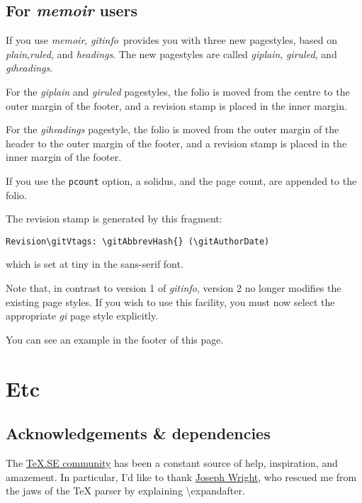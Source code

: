 \documentclass[a4paper,12pt,twoside,openany]{memoir}
\newcommand{\sfit}[1]{\textit{#1}}
\newcommand{\tpname}{\sfit{gitinfo}}
\begin{document}
\section{For \sfit{memoir} users}
If you use \sfit{memoir}, \tpname\ provides you with
three new pagestyles, based on
\sfit{plain},\sfit{ruled}, and \sfit{headings}.
The new pagestyles are called
\sfit{giplain}, \sfit{giruled}, and \sfit{giheadings}.

For the \sfit{giplain} and \sfit{giruled} pagestyles,
the folio is moved from the centre to the outer margin of the footer,
and a revision stamp is placed in the inner margin.

For the \sfit{giheadings} pagestyle,
the folio is moved from the outer margin of the header
to the outer margin of the footer,
and a revision stamp is placed in the inner margin of the footer.

If you use the \texttt{pcount} option, a solidus, and the page count,
are appended to the folio.

The revision stamp is generated by this fragment:
\vspace{0.5\baselineskip}

\noindent
\verb!Revision\gitVtags: \gitAbbrevHash{} (\gitAuthorDate)!
\vspace{0.5\baselineskip}

\noindent
which is set at tiny in the sans-serif font.

Note that, in contrast to version 1 of \tpname,
version 2 no longer modifies the existing page styles.
If you wish to use this facility,
you must now select
the appropriate \sfit{gi\textellipsis} page style explicitly.



You can see an example in the footer of this page.
\chapter{Etc}
\section{Acknowledgements \& dependencies}

The \href{http://tex.stackexchange.com}{\TeX.SE community}
has been a constant source of help, inspiration, and amazement.
In particular, I'd like to thank
\href{http://tex.stackexchange.com/users/73/joseph-wright}{Joseph Wright},
who rescued me from the jaws of the TeX parser by explaining
\textbackslash expandafter.
\end{document}
